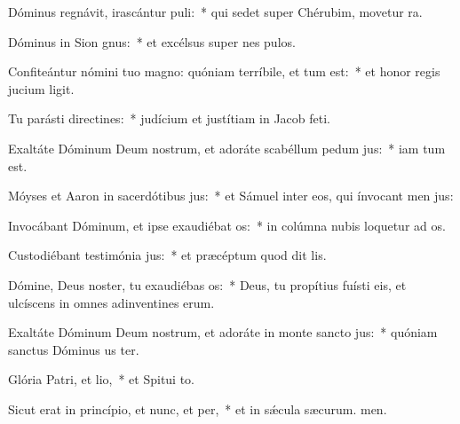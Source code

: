 \item Dóminus regnávit, irascántur puli:~* qui sedet super Chérubim, movetur ra.
\item Dóminus in Sion gnus:~* et excélsus super nes pulos.
\item Confiteántur nómini tuo magno: quóniam terríbile, et tum est:~* et honor regis jucium ligit.
\item Tu parásti directines:~* judícium et justítiam in Jacob  feti.
\item Exaltáte Dóminum Deum nostrum, et adoráte scabéllum pedum jus:~* iam tum est.
\item Móyses et Aaron in sacerdótibus jus:~* et Sámuel inter eos, qui ínvocant men jus:
\item Invocábant Dóminum, et ipse exaudiébat os:~* in colúmna nubis loquetur ad os.
\item Custodiébant testimónia jus:~* et præcéptum quod dit lis.
\item Dómine, Deus noster, tu exaudiébas os:~* Deus, tu propítius fuísti eis, et ulcíscens in omnes adinventines erum.
\item Exaltáte Dóminum Deum nostrum, et adoráte in monte sancto jus:~* quóniam sanctus Dóminus us ter.
\item Glória Patri, et lio,~* et Spitui to.
\item Sicut erat in princípio, et nunc, et per,~* et in sǽcula sæcurum. men.
